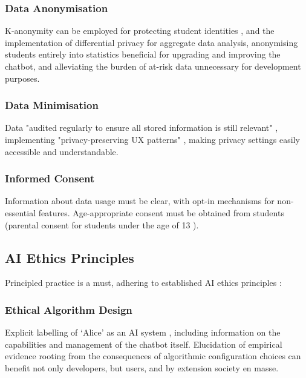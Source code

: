 \documentclass[14pt,a4paper]{article}
\begin{document}
\begin{multicols}{2}
\subsubsection{Data Anonymisation}
K-anonymity can be employed for protecting student identities \textit{\parencite[pp. 75-100]{ElEmamArbuckle2023}}, and the implementation of differential privacy for aggregate data analysis, anonymising students entirely into statistics beneficial for upgrading and improving the chatbot, and alleviating the burden of at-risk data unnecessary for development purposes.

\subsubsection{Data Minimisation}
Data "audited regularly to ensure all stored information is still relevant" \textit{\parencite{A29WP2018}}, implementing "privacy-preserving UX patterns" \textit{\parencite[pp. 50-100]{Hartzog2023}}, making privacy settings easily accessible and understandable.

\subsubsection*{Informed Consent}
Information about data usage must be clear, with opt-in mechanisms for non-essential features. Age-appropriate consent must be obtained from students (parental consent for students under the age of 13 \textit{\parencite{FTC2023}}).

\subsection{AI Ethics Principles}
Principled practice is a must, adhering to established AI ethics principles \textit{\parencite{EC2024}}:


\subsubsection{Ethical Algorithm Design}
Explicit labelling of `Alice' as an AI system \textit{\parencite{IEEE2023}}, including information on the capabilities and management of the chatbot itself. Elucidation of empirical evidence rooting from the consequences of algorithmic configuration choices can benefit not only developers, but users, and by extension society en masse.


\end{multicols}
\end{document}
